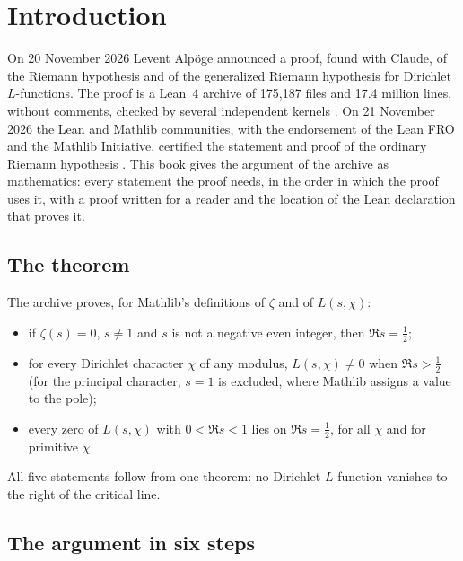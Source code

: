 \chapter*{Introduction}\label{ch:intro}

On 20 November 2026 Levent Alpöge announced a proof, found with Claude, of the Riemann hypothesis and of the generalized Riemann hypothesis for Dirichlet $L$-functions. The proof is a Lean~4 archive of 175{,}187 files and 17.4 million lines, without comments, checked by several independent kernels \cite{sutherland-2026}. On 21 November 2026 the Lean and Mathlib communities, with the endorsement of the Lean FRO and the Mathlib Initiative, certified the statement and proof of the ordinary Riemann hypothesis \cite{leanfro-2026}. This book gives the argument of the archive as mathematics: every statement the proof needs, in the order in which the proof uses it, with a proof written for a reader and the location of the Lean declaration that proves it.

\section*{The theorem}

The archive proves, for Mathlib's definitions of $\zeta$ and of $L(s,\chi)$:
\begin{itemize}
\item if $\zeta(s)=0$, $s\neq1$ and $s$ is not a negative even integer, then $\Re s=\tfrac12$;
\item for every Dirichlet character $\chi$ of any modulus, $L(s,\chi)\ne0$ when $\Re s>\tfrac12$ (for the principal character, $s=1$ is excluded, where Mathlib assigns a value to the pole);
\item every zero of $L(s,\chi)$ with $0<\Re s<1$ lies on $\Re s=\tfrac12$, for all $\chi$ and for primitive $\chi$.
\end{itemize}
All five statements follow from one theorem: no Dirichlet $L$-function vanishes to the right of the critical line.

\section*{The argument in six steps}

